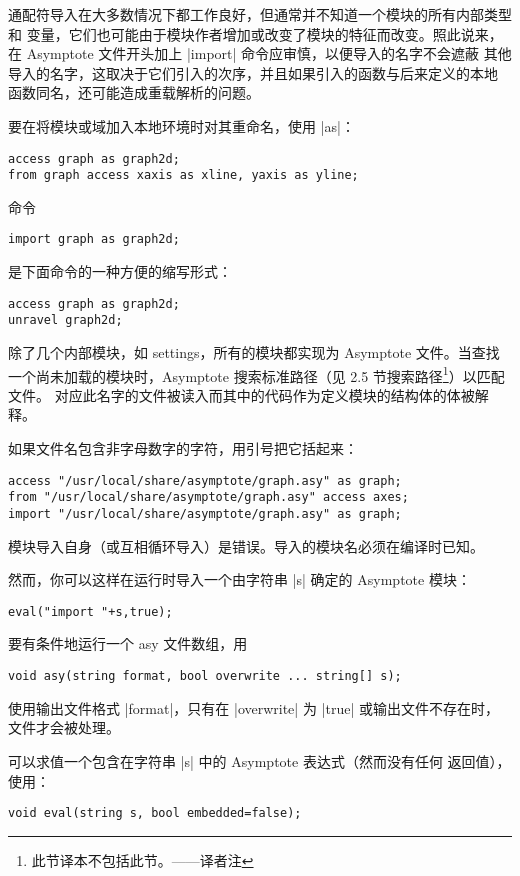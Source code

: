 \documentclass[nofonts,CJKnormalspaces]{ctexbook}[2009/05/20]
\newcommand*\prgname[1]{\textsf{#1}}
\newcommand\transnote[1]{\footnote{#1——译者注}}
\begin{document}
{{{通配符导入在大多数情况下都工作良好，但通常并不知道一个模块的所有内部类型和
变量，它们也可能由于模块作者增加或改变了模块的特征而改变。照此说来，在
\prgname{Asymptote} 文件开头加上 |import| 命令应审慎，以便导入的名字不会遮蔽
其他导入的名字，这取决于它们引入的次序，并且如果引入的函数与后来定义的本地
函数同名，还可能造成重载解析的问题。

要在将模块或域加入本地环境时对其重命名，使用 |as|：
\begin{lstlisting}
access graph as graph2d;
from graph access xaxis as xline, yaxis as yline;
\end{lstlisting}

命令
\begin{lstlisting}
import graph as graph2d;
\end{lstlisting}
是下面命令的一种方便的缩写形式：
\begin{lstlisting}
access graph as graph2d;
unravel graph2d;
\end{lstlisting}

除了几个内部模块，如 \prgname{settings}，所有的模块都实现为
\prgname{Asymptote} 文件。当查找一个尚未加载的模块时，\prgname{Asymptote}
搜索标准路径（见 2.5 节搜索路径\transnote{此节译本不包括此节。}）以匹配文件。
对应此名字的文件被读入而其中的代码作为定义模块的结构体的体被解释。

如果文件名包含非字母数字的字符，用引号把它括起来：
\begin{lstlisting}
access "/usr/local/share/asymptote/graph.asy" as graph;
from "/usr/local/share/asymptote/graph.asy" access axes;
import "/usr/local/share/asymptote/graph.asy" as graph;
\end{lstlisting}

模块导入自身（或互相循环导入）是错误。导入的模块名必须在编译时已知。

然而，你可以这样在运行时导入一个由字符串 |s| 确定的 \prgname{Asymptote}
模块：
\begin{lstlisting}
eval("import "+s,true);
\end{lstlisting}

要有条件地运行一个 asy 文件数组，用
\begin{lstlisting}
void asy(string format, bool overwrite ... string[] s);
\end{lstlisting}

使用输出文件格式 |format|，只有在 |overwrite| 为 |true| 或输出文件不存在时，
文件才会被处理。

可以求值一个包含在字符串 |s| 中的 \prgname{Asymptote} 表达式（然而没有任何
返回值），使用：
\begin{lstlisting}
void eval(string s, bool embedded=false);
\end{lstlisting}

}}}
\end{document}
